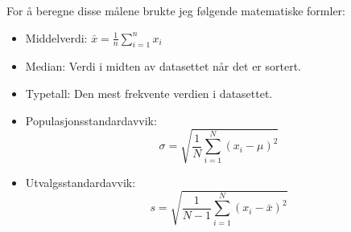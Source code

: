 \documentclass{article}
\begin{document}
For å beregne disse målene brukte jeg følgende matematiske formler:
\begin{itemize}
    \item Middelverdi: $\bar{x} = \frac{1}{n}\sum_{i=1}^{n} x_i$
    \item Median: Verdi i midten av datasettet når det er sortert.
    \item Typetall: Den mest frekvente verdien i datasettet.
    \item Populasjonsstandardavvik: 
    \[
    \sigma = \sqrt{\frac{1}{N}\sum_{i=1}^{N}(x_i - \mu)^2}
    \]
    \item Utvalgsstandardavvik: 
    \[
    s = \sqrt{\frac{1}{N-1}\sum_{i=1}^{N}(x_i - \bar{x})^2}
    \]
\end{itemize}
\end{document}
